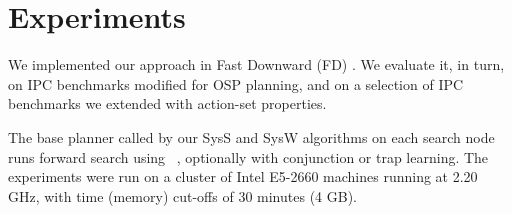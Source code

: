 

\newcommand{\scatterplotsize}{8cm}
\newcommand{\scatterplotxlabelshift}{1.5ex}
\newcommand{\scatterplotylabelshift}{-3ex}



\section{Experiments}
\label{experiments}




We implemented our approach in Fast Downward
(FD) \cite{helmert:jair-06}. We evaluate it, in turn, on IPC
benchmarks modified for OSP planning, and on a selection of IPC
benchmarks we extended with action-set properties.

The base planner called by our SysS and SysW algorithms on each search
node runs forward search using
\hff\ \cite{hoffmann:nebel:jair-01}, optionally with conjunction or trap learning.
%
%
The experiments were run on a cluster of Intel E5-2660 machines
running at 2.20 GHz, with time (memory) cut-offs of 30 minutes (4 GB).



 





